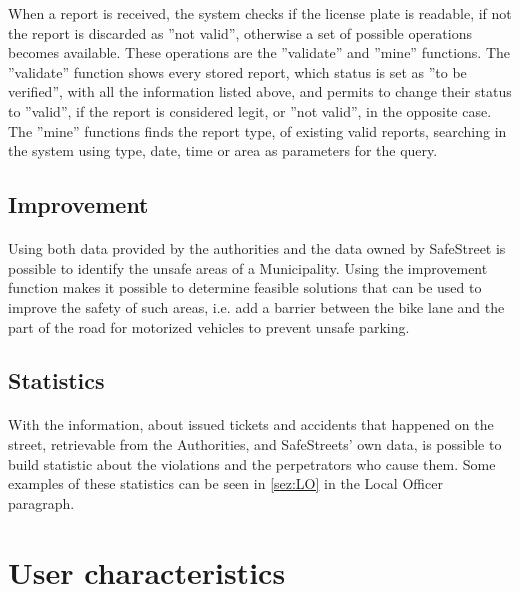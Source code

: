 					When a report is received, the system checks if the license plate is readable, if not the report is discarded as ''not valid'', otherwise a set of possible operations becomes available. These operations are the ''validate'' and ''mine'' functions. The ''validate'' function shows every stored report, which status is set as ''to be verified'', with all the information listed above, and permits to change their status to ''valid'', if the report is considered legit, or ''not valid'', in the opposite case. The ''mine'' functions finds the report type, of existing valid reports, searching in the system using type, date, time or area as parameters for the query.
			\subsection{Improvement}
				\paragraph{}
					Using both data provided by the authorities and the data owned by SafeStreet is possible to identify the unsafe areas of a Municipality. Using the improvement function makes it possible to determine feasible solutions that can be used to improve the safety of such areas, i.e. add a barrier between the bike lane and the part of the road for motorized vehicles to prevent unsafe parking.
			\subsection{Statistics}
				\paragraph{}
					With the information, about issued tickets and accidents that happened on the street, retrievable from the Authorities, and SafeStreets' own data, is possible to build statistic about the violations and the perpetrators who cause them. Some examples of these statistics can be seen in \ref{sez:LO} in the Local Officer paragraph.
		\section{User characteristics} \label{sez:UserCharacteristics}
